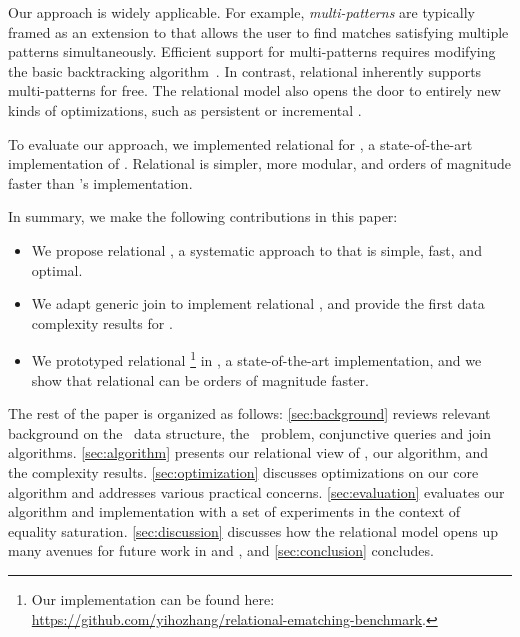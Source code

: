 Our approach is widely applicable.
For example, \textit{multi-patterns} are
 typically framed as an extension to \ematching
 that allows the user to find matches
 satisfying multiple patterns simultaneously.
Efficient support for multi-patterns requires modifying the basic
 backtracking algorithm~\cite{efficient-ematching}.
In contrast, relational \ematching inherently supports multi-patterns for free.
The relational model also opens the door
 to entirely new kinds of optimizations,
 such as persistent or incremental \egraphs.

To evaluate our approach, we implemented relational \ematching for \egg, a
 state-of-the-art implementation of \egraphs.
Relational \ematching
 is simpler, more modular, and orders of magnitude faster
 than \egg's \ematching implementation.

In summary, we make the following contributions in this paper:
\begin{itemize}
\item We propose relational \ematching, a systematic approach to \ematching that
  is simple, fast, and optimal.
\item We adapt generic join to implement relational \ematching,
  and provide the first data complexity results for \ematching.
\item We prototyped relational \ematching\footnote{
  Our implementation can be found here: \url{https://github.com/yihozhang/relational-ematching-benchmark}.
  } in \egg,
  a state-of-the-art \egraph implementation,
  and we show that relational \ematching can be orders of magnitude faster.
\end{itemize}

The rest of the paper is organized as follows: \autoref{sec:background} reviews
relevant background on the \egraph~data structure, the \ematching~problem,
conjunctive queries and join algorithms.
\autoref{sec:algorithm} presents our
 relational view of \egraphs,
 our \ematching algorithm,
 and the complexity results.
\autoref{sec:optimization} discusses
optimizations on our core algorithm and addresses various practical concerns.
\autoref{sec:evaluation} evaluates our algorithm and implementation with a set of
experiments in the context of equality saturation.
\autoref{sec:discussion} discusses how the relational model opens up
 many avenues for future work in \egraphs and \ematching,
 and \autoref{sec:conclusion} concludes.

